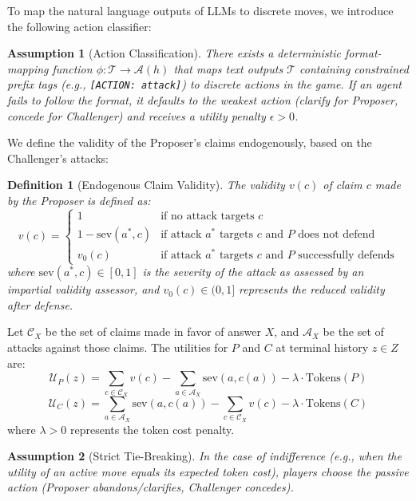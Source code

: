 \documentclass[11pt,a4paper]{article}
\newtheorem{definition}{Definition}
\newtheorem{assumption}{Assumption}
\begin{document}
To map the natural language outputs of LLMs to discrete moves, we introduce the following action classifier:
\begin{assumption}[Action Classification]
There exists a deterministic format-mapping function $\phi: \mathcal{T} \to \mathcal{A}(h)$ that maps text outputs $\mathcal{T}$ containing constrained prefix tags (e.g., \texttt{[ACTION: attack]}) to discrete actions in the game. If an agent fails to follow the format, it defaults to the weakest action (clarify for Proposer, concede for Challenger) and receives a utility penalty $\epsilon > 0$.
\end{assumption}

We define the validity of the Proposer's claims endogenously, based on the Challenger's attacks:
\begin{definition}[Endogenous Claim Validity]
The validity $v(c)$ of claim $c$ made by the Proposer is defined as:
$$v(c) = \begin{cases}
1 & \text{if no attack targets } c \\
1 - \text{sev}(a^*, c) & \text{if attack } a^* \text{ targets } c \text{ and } P \text{ does not defend} \\
v_0(c) & \text{if attack } a^* \text{ targets } c \text{ and } P \text{ successfully defends}
\end{cases}$$
where $\text{sev}(a^*, c) \in [0, 1]$ is the severity of the attack as assessed by an impartial validity assessor, and $v_0(c) \in (0, 1]$ represents the reduced validity after defense.
\end{definition}

Let $\mathcal{C}_X$ be the set of claims made in favor of answer $X$, and $\mathcal{A}_X$ be the set of attacks against those claims. The utilities for $P$ and $C$ at terminal history $z \in Z$ are:
$$\mathcal{U}_P(z) = \sum_{c \in \mathcal{C}_X} v(c) - \sum_{a \in \mathcal{A}_X} \text{sev}(a, c(a)) - \lambda \cdot \text{Tokens}(P)$$
$$\mathcal{U}_C(z) = \sum_{a \in \mathcal{A}_X} \text{sev}(a, c(a)) - \sum_{c \in \mathcal{C}_X} v(c) - \lambda \cdot \text{Tokens}(C)$$
where $\lambda > 0$ represents the token cost penalty.

\begin{assumption}[Strict Tie-Breaking]
In the case of indifference (e.g., when the utility of an active move equals its expected token cost), players choose the passive action (Proposer abandons/clarifies, Challenger concedes).
\end{assumption}
\end{document}
